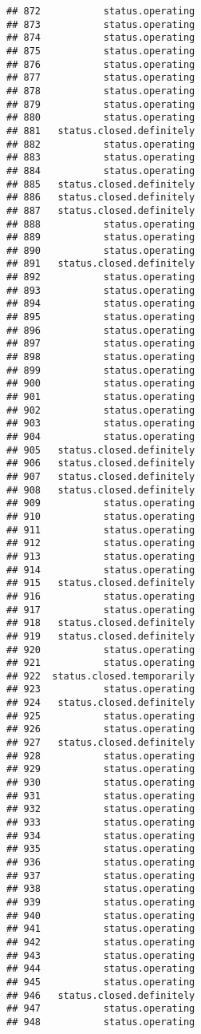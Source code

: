 \documentclass[
]{article}
\begin{document}
\begin{verbatim}
## 872           status.operating
## 873           status.operating
## 874           status.operating
## 875           status.operating
## 876           status.operating
## 877           status.operating
## 878           status.operating
## 879           status.operating
## 880           status.operating
## 881   status.closed.definitely
## 882           status.operating
## 883           status.operating
## 884           status.operating
## 885   status.closed.definitely
## 886   status.closed.definitely
## 887   status.closed.definitely
## 888           status.operating
## 889           status.operating
## 890           status.operating
## 891   status.closed.definitely
## 892           status.operating
## 893           status.operating
## 894           status.operating
## 895           status.operating
## 896           status.operating
## 897           status.operating
## 898           status.operating
## 899           status.operating
## 900           status.operating
## 901           status.operating
## 902           status.operating
## 903           status.operating
## 904           status.operating
## 905   status.closed.definitely
## 906   status.closed.definitely
## 907   status.closed.definitely
## 908   status.closed.definitely
## 909           status.operating
## 910           status.operating
## 911           status.operating
## 912           status.operating
## 913           status.operating
## 914           status.operating
## 915   status.closed.definitely
## 916           status.operating
## 917           status.operating
## 918   status.closed.definitely
## 919   status.closed.definitely
## 920           status.operating
## 921           status.operating
## 922  status.closed.temporarily
## 923           status.operating
## 924   status.closed.definitely
## 925           status.operating
## 926           status.operating
## 927   status.closed.definitely
## 928           status.operating
## 929           status.operating
## 930           status.operating
## 931           status.operating
## 932           status.operating
## 933           status.operating
## 934           status.operating
## 935           status.operating
## 936           status.operating
## 937           status.operating
## 938           status.operating
## 939           status.operating
## 940           status.operating
## 941           status.operating
## 942           status.operating
## 943           status.operating
## 944           status.operating
## 945           status.operating
## 946   status.closed.definitely
## 947           status.operating
## 948           status.operating

\end{verbatim}
\end{document}

